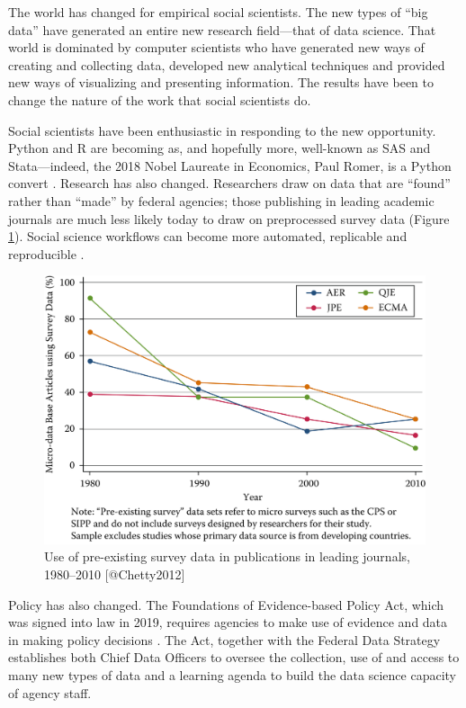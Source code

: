 \documentclass[]{krantz}
\begin{document}
The world has changed for empirical social scientists. The new types of
``big data'' have generated an entire new research field---that of data
science. That world is dominated by computer scientists who have
generated new ways of creating and collecting data, developed new
analytical techniques and provided new ways of visualizing and
presenting information. The results have been to change the nature of
the work that social scientists do.

Social scientists have been enthusiastic in responding to the new
opportunity. Python and R are becoming as, and hopefully more,
well-known as SAS and Stata---indeed, the 2018 Nobel Laureate in
Economics, Paul Romer, is a Python convert \citep{Kopf}. Research has
also changed. Researchers draw on data that are ``found'' rather than
``made'' by federal agencies; those publishing in leading academic
journals are much less likely today to draw on preprocessed survey data
(Figure \ref{fig:fig1}). Social science workflows can become more
automated, replicable and reproducible \citep{Yarkoni2019}.

\begin{figure}

{\centering \includegraphics[width=0.7\linewidth]{ChapterIntro/figures/Figure1} 

}

\caption{Use of pre-existing survey data in publications in leading journals, 1980--2010 [@Chetty2012]}\label{fig:fig1}
\end{figure}

Policy has also changed. The Foundations of Evidence-based Policy Act,
which was signed into law in 2019, requires agencies to make use of
evidence and data in making policy decisions \citep{Hart}. The Act,
together with the Federal Data Strategy
\citep{OfficeofManagementandBudget} establishes both Chief Data Officers
to oversee the collection, use of and access to many new types of data
and a learning agenda to build the data science capacity of agency
staff.
\end{document}
